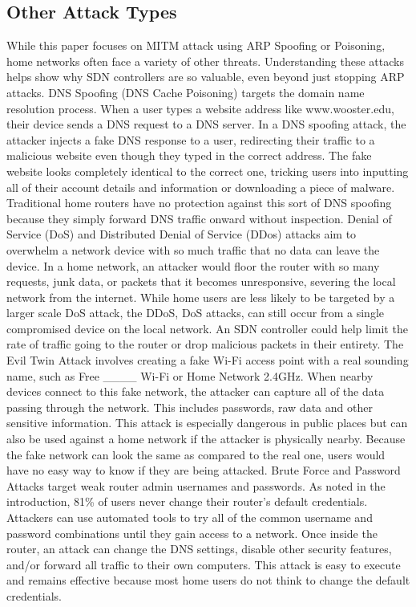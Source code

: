 \documentclass[12pt]{article}
\begin{document}
\subsection{Other Attack Types}
While this paper focuses on MITM attack using ARP Spoofing or Poisoning, home networks often face a 
variety of other threats. Understanding these attacks helps show why SDN controllers are so valuable, 
even beyond just stopping ARP attacks. 
DNS Spoofing (DNS Cache Poisoning) targets the domain name resolution process. When a user types a website 
address like www.wooster.edu, their device sends a DNS request to a DNS server. In a DNS spoofing attack, 
the attacker injects a fake DNS response to a user, redirecting their traffic to a malicious website even 
though they typed in the correct address. The fake website looks completely identical to the correct one, 
tricking users into inputting all of their account details and information or downloading a piece of 
malware. Traditional home routers have no protection against this sort of DNS spoofing because they simply 
forward DNS traffic onward without inspection.
Denial of Service (DoS) and Distributed Denial of Service (DDos) attacks aim to overwhelm a network device 
with so much traffic that no data can leave the device. In a home network, an attacker would floor the 
router with so many requests, junk data, or packets that it becomes unresponsive, severing the local 
network from the internet. While home users are less likely to be targeted by a larger scale DoS attack, 
the DDoS, DoS attacks, can still occur from a single compromised device on the local network. An SDN 
controller could help limit the rate of traffic going to the router or drop malicious packets in their 
entirety. 
The Evil Twin Attack involves creating a fake Wi-Fi access point with a real sounding name, such as 
Free \_\_\_\_ Wi-Fi or Home Network 2.4GHz. When nearby devices connect to this fake network, the attacker can 
capture all of the data passing through the network. This includes passwords, raw data and other sensitive 
information. This attack is especially dangerous in public places but can also be used against a home 
network if the attacker is physically nearby. Because the fake network can look the same as compared to 
the real one, users would have no easy way to know if they are being attacked. 
Brute Force and Password Attacks target weak router admin usernames and passwords. As noted in the 
introduction, 81\% of users never change their router's default credentials. Attackers can use automated 
tools to try all of the common username and password combinations until they gain access to a network. 
Once inside the router, an attack can change the DNS settings, disable other security features, and/or 
forward all traffic to their own computers. This attack is easy to execute and remains effective because 
most home users do not think to change the default credentials.
\end{document}
